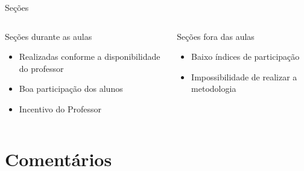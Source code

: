 \documentclass[10pt]{beamer}
\begin{document}
\begin{frame}{Se\c{c}\~oes}

\begin{columns}[t]
		\begin{column}{.425\textwidth}
			\begin{block}{Se\c{c}\~oes durante as aulas}
				\begin{itemize}
					\item Realizadas conforme a disponibilidade do professor
					\item Boa participa\c{c}\~ao dos alunos
					\item Incentivo do Professor
				\end{itemize}
			\end{block}
		\end{column}
		\begin{column}{.425\textwidth}
			\begin{block}{Se\c{c}\~oes fora das aulas}
				\begin{itemize}
					\item Baixo índices de participação
					\item Impossibilidade de realizar a metodologia
				\end{itemize}
			\end{block}
		\end{column}
	\end{columns}

\end{frame}


%  


\section{Coment\'arios}
\end{document}
